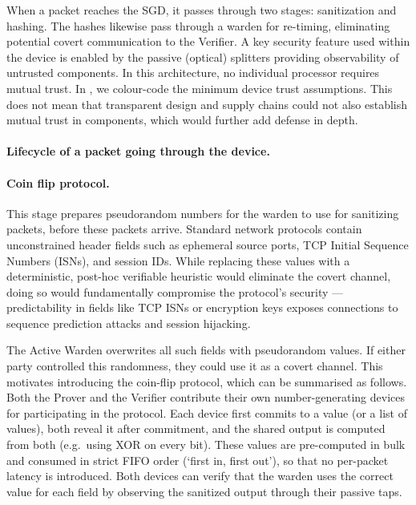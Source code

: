 \documentclass{article}
\begin{document}
When a packet reaches the SGD, it passes through two stages: sanitization and hashing. The hashes likewise pass through a warden for re-timing, eliminating potential covert communication to the Verifier. A key security feature used within the device is enabled by the passive (optical) splitters providing observability of untrusted components. In this architecture, no individual processor requires mutual trust. In , we colour-code the minimum device trust assumptions. This does not mean that transparent design and supply chains could not also establish mutual trust in components, which would further add defense in depth.

\paragraph{Lifecycle of a packet going through the device.}

\paragraph{Coin flip protocol.} This stage prepares pseudorandom numbers for the warden to use for sanitizing packets, before these packets arrive. Standard network protocols contain unconstrained header fields such as ephemeral source ports, TCP Initial Sequence Numbers (ISNs), and session IDs. While replacing these values with a deterministic, post-hoc verifiable heuristic would eliminate the covert channel, doing so would fundamentally compromise the protocol's security --- predictability in fields like TCP ISNs or encryption keys exposes connections to sequence prediction attacks and session hijacking.

The Active Warden overwrites all such fields with pseudorandom values. If either party controlled this randomness, they could use it as a covert channel. This motivates introducing the coin-flip protocol, which can be summarised as follows. Both the Prover and the Verifier contribute their own number-generating devices for participating in the protocol. Each device first commits to a value (or a list of values), both reveal it after commitment, and the shared output is computed from both (e.g.\ using XOR on every bit). These values are pre-computed in bulk and consumed in strict FIFO order (`first in, first out'), so that no per-packet latency is introduced. Both devices can verify that the warden uses the correct value for each field by observing the sanitized output through their passive taps.
\end{document}
